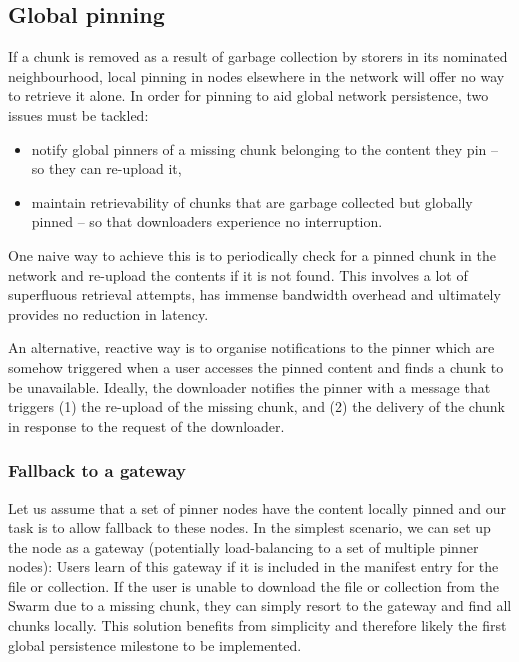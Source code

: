 \subsection{Global pinning}\label{sec:global-pinning}

If a chunk is removed as a result of garbage collection by storers in its nominated neighbourhood, local pinning in nodes elsewhere in the network will offer no way to retrieve it alone. In order for pinning to aid global network persistence, two issues must be tackled:

\begin{itemize}[noitemsep]
    \item  notify global pinners of a missing chunk belonging to the content they pin -- so they can re-upload it,
    \item  maintain retrievability of chunks that are garbage collected but globally pinned -- so that downloaders experience no interruption. 
\end{itemize}

One naive way to achieve this is to periodically check for a pinned chunk in the network and re-upload the contents if it is not found. This involves a lot of superfluous retrieval attempts, has immense bandwidth overhead and ultimately provides no reduction in latency.

An alternative, reactive way is to organise notifications to the pinner which are somehow triggered when a user accesses the pinned content and finds a chunk to be unavailable. Ideally, the downloader notifies the pinner with a message that triggers (1) the re-upload of the missing chunk, and (2) the delivery of the chunk in response to the request of the downloader.  

\subsubsection{Fallback to a gateway}

Let us assume that a set of pinner nodes have the content locally pinned and our task is to allow fallback to these nodes. In the simplest scenario, we can set up the node as a gateway (potentially load-balancing to a set of multiple pinner nodes): Users learn of this gateway if it is included in the manifest entry for the file or collection. If the user is unable to download the file or collection from the Swarm due to a missing chunk, they can simply resort to the gateway and find all chunks locally.
This solution benefits from simplicity and therefore likely the first global persistence milestone to be implemented.  

